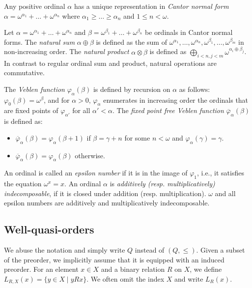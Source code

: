 \documentclass[10pt,a4paper]{amsart}
\let \leq \leqslant
\let \geq \geqslant
\let \phi \varphi
\begin{document}
Any positive ordinal $\alpha$ has a unique representation in \textit{Cantor normal form} $\alpha = \omega^{\alpha_1}+\dots+\omega^{\alpha_n}$ where $\alpha_1 \geq \dots \geq \alpha_n$ and $1 \leq n < \omega$.

Let $\alpha = \omega^{\alpha_1}+\dots+\omega^{\alpha_n}$ and $\beta = \omega^{\beta_1}+\dots+\omega^{\beta_n}$ be ordinals in Cantor normal forms. The \textit{natural sum} $\alpha \oplus \beta$ is defined as the sum of $\omega^{\alpha_1},\dots,\omega^{\alpha_n},\omega^{\beta_1},\dots,\omega^{\beta_m}$ in non-increasing order. The \textit{natural product} $\alpha \otimes \beta$ is defined as $\bigoplus_{i<n,j<m} \omega^{\alpha_i\oplus\beta_j}$. In contrast to regular ordinal sum and product, natural operations are commutative.

The \textit{Veblen function} $\phi_\alpha(\beta)$ is defined by recursion on $\alpha$ as follows: $\phi_0(\beta) = \omega^\beta$, and for $\alpha > 0$, $\phi_\alpha$ enumerates in increasing order the ordinals that are fixed points of $\phi_{\alpha'}$ for all $\alpha' < \alpha$. The \textit{fixed point free Veblen function} $\overline{\phi}_\alpha(\beta)$ is defined as:
\begin{itemize}
    \item $\overline{\phi}_\alpha(\beta) = \phi_\alpha(\beta+1)$ if $\beta = \gamma+n$ for some $n < \omega$ and $\phi_\alpha(\gamma) = \gamma$.
    \item $\overline{\phi}_\alpha(\beta) = \phi_\alpha(\beta)$ otherwise.
\end{itemize}

An ordinal is called an \textit{epsilon number} if it is in the image of $\phi_1$, i.e., it satisfies the equation $\omega^x = x$. An ordinal $\alpha$ is \textit{additively (resp. multiplicatively) indecomposable}, if it is closed under addition (resp. multiplication). $\omega$ and all epsilon numbers are additively and multiplicatively indecomposable.

\subsection{Well-quasi-orders}\label{wqos}

We abuse the notation and simply write $Q$ instead of $(Q, \leq)$. Given a subset of the preorder, we implicitly assume that it is equipped with an induced preorder. For an element $x \in X$ and a binary relation $R$ on $X$, we define $L_{R,X}(x) = \{y \in X \mid y R x\}$. We often omit the index $X$ and write $L_R(x)$.
\end{document}
